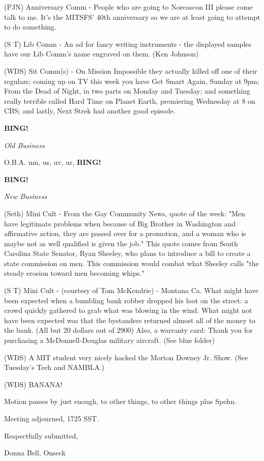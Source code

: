 \documentclass[12pt]{article}
\newcommand{\bing}{{\bf BING!} }
\newcommand{\goto}[1]{\bing \vskip 12pt \centerline{{\em{#1}}}}
\begin{document}
(PJN) Anniversary Comm - People who are going to Noreascon III please come talk to me. It's the MITSFS' 40th anniversary so we are at least going to attempt to do something.

(S T) Lib Comm - An ad for fancy writing instruments - the displayed samples have our Lib Comm's name engraved on them. (Ken Johnson)

(WDS) Sit Comm(s) - On Mission Impossible they actually killed off one of their regulars; coming up on TV this week you have Get Smart Again, Sunday at 9pm; From the Dead of Night, in two parts on Monday and Tuesday; and something really terrible called Hard Time on Planet Earth, premiering Wednesday at 8 on CBS; and lastly, Next Strek had another good episode.

\goto{Old Business}

O.B.A. um, us, uv, ur, \bing

\goto{New Business}

(Seth) Mini Cult - From the Gay Community News, quote of the week: "Men have legitimate problems when because of Big Brother in Washington and affirmative action, they are passed over for a promotion, and a woman who is maybe not as well qualified is given the job."  This quote comes from South Carolina State Senator, Ryan Sheeley, who plans to introduce a bill to create a state commission on men. This commission would combat what Sheeley calls "the steady erosion toward men becoming whips."

(S T) Mini Cult - (courtesy of Tom McKendrie) - Montana Ca.  What might have been expected when a bumbling bank robber dropped his loot on the street: a crowd quickly gathered to grab what was blowing in the wind. What might not have been expected was that the bystanders returned almost all of the money to the bank. (All but 20 dollars out of 2900) Also, a warranty card: Thank you for purchasing a McDonnell-Douglas military aircraft. (See blue folder)

(WDS) A MIT student very nicely hacked the Morton Downey Jr. Show. (See Tuesday's Tech and NAMBLA.)

(WDS) BANANA!

Motion passes by just enough, to other things, to other things plus Spehn.  

\vspace{12pt}

\noindent
Meeting adjourned, 1725 SST.

\vspace{18pt}

\centerline{Respectfully submitted,}
\centerline{Donna Bell, Onseck}
\end{document}
